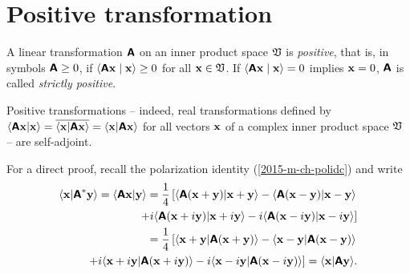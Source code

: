 \section{Positive transformation}
\label{2015-m-ch-fdlvs-positive}

A linear transformation  $\textsf{\textbf{A}}$ on an inner product space ${\frak V}$ is {\em positive},
that is, in symbols $\textsf{\textbf{A}}\ge 0$,
if $\langle \textsf{\textbf{A}}{\bf x}\mid {\bf x}\rangle  \ge 0$ for all ${\bf x}\in {\frak V}$.
If  $\langle \textsf{\textbf{A}}{\bf x}\mid {\bf x}\rangle = 0$ implies
${\bf x}=0$, $\textsf{\textbf{A}}$ is called {\em strictly positive}.


Positive transformations -- indeed, real transformations defined by
$
\langle \textsf{\textbf{A}} {\bf x}\vert {\bf x}\rangle
= \overline{\langle {\bf x}\vert \textsf{\textbf{A}}{\bf x}\rangle }
=
\langle {\bf x}\vert \textsf{\textbf{A}}{\bf x}\rangle$
for all vectors  ${\bf x}$
of a complex inner product space ${\frak V}$ --
are self-adjoint.

{\color{OliveGreen}\bproof
For a direct proof,
recall the
polarization identity
(\ref{2015-m-ch-polidc})
and write
\begin{equation}
\begin{split}
\langle {\bf x}\vert \textsf{\textbf{A}}^\ast {\bf y}\rangle
=
\langle \textsf{\textbf{A}} {\bf x}\vert {\bf y}\rangle
=
\frac{1}{4}\left[
\langle \textsf{\textbf{A}} ({\bf x}+ {\bf y}) \vert {\bf x}+ {\bf y}\rangle
-
\langle \textsf{\textbf{A}}({\bf x}- {\bf y}) \vert {\bf x}- {\bf y}\rangle \right.  \\
\left.
+ i
\langle \textsf{\textbf{A}} ({\bf x}+ i{\bf y}) \vert {\bf x}+ i{\bf y}\rangle
- i
\langle \textsf{\textbf{A}} ({\bf x}- i{\bf y}) \vert {\bf x} -i {\bf y}\rangle
\right]
\\
=
\frac{1}{4}\left[
\langle {\bf x}+ {\bf y} \vert \textsf{\textbf{A}} ({\bf x}+ {\bf y})\rangle
-
\langle {\bf x}- {\bf y} \vert \textsf{\textbf{A}}({\bf x}- {\bf y})\rangle \right.  \\
\left.
+ i
\langle {\bf x}+ i{\bf y} \vert \textsf{\textbf{A}} ({\bf x}+ i{\bf y})\rangle
- i
\langle {\bf x}- i{\bf y} \vert \textsf{\textbf{A}} ({\bf x} -i {\bf y})\rangle
\right]
=
\langle {\bf x}\vert \textsf{\textbf{A}}{\bf y}\rangle
.
\end{split}
\label{2015-m-ch-polidrv}
\end{equation}
\eproof
}



